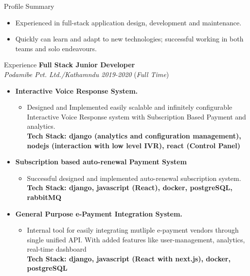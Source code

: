 \documentclass{resume} %
\begin{document}
\begin{rSection}{Profile Summary}
\begin{itemize}
    \item  Experienced in full-stack application design, development and maintenance.
    \item  Quickly can learn and adapt to new technologies; successful working in both teams and solo endeavours.
\end{itemize}
\end{rSection}

\begin{rSection}{Experience}
\large{{\bf Full Stack Junior Developer}}
\\ \small{\textit{Podamibe Pvt. Ltd./Kathamndu 2019-2020}} (\small{\textit{Full Time}})
\begin{itemize}
    \item \textbf{Interactive Voice Response System.}
        \begin{itemize}
            \item Designed and Implemented easily scalable and infinitely configurable Interactive Voice Response system
            with Subscription Based Payment and analytics.
            \\ \footnotesize{\textbf{Tech Stack: django (analytics and configuration management), nodejs (interaction with low level IVR), react (Control Panel)}}
        \end{itemize}

    \item \textbf{Subscription based auto-renewal Payment System}
        \begin{itemize}
            \item Successful designed and implemented auto-renewal subscription system.
            \\ \footnotesize{\textbf{Tech Stack: django, javascript (React), docker, postgreSQL, rabbitMQ}}
        \end{itemize}

    \item \textbf{General Purpose e-Payment Integration System.}
        \begin{itemize}
            \item Internal tool for easily integrating mutliple e-payment vendors through single unified API. With added features like user-management, analytics, real-time dashboard
            \\ \footnotesize{\textbf{Tech Stack: django, javascript (React with next.js), docker, postgreSQL}}
        \end{itemize}


\end{itemize}
\end{rSection}
\end{document}
